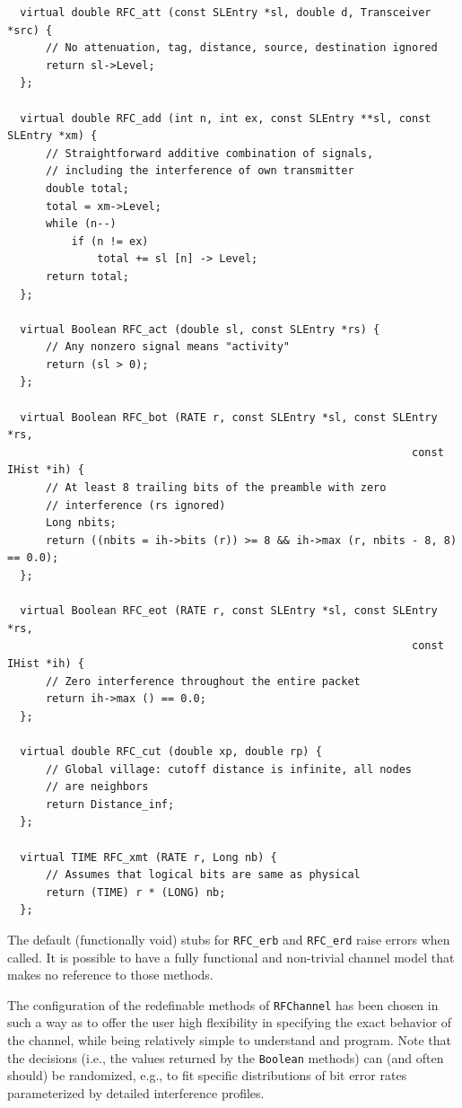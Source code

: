 {\small\begin{verbatim}
  virtual double RFC_att (const SLEntry *sl, double d, Transceiver *src) {
      // No attenuation, tag, distance, source, destination ignored
      return sl->Level;
  };

  virtual double RFC_add (int n, int ex, const SLEntry **sl, const SLEntry *xm) {
      // Straightforward additive combination of signals,
      // including the interference of own transmitter
      double total;
      total = xm->Level;
      while (n--)
          if (n != ex)
              total += sl [n] -> Level;
      return total;
  };

  virtual Boolean RFC_act (double sl, const SLEntry *rs) {
      // Any nonzero signal means "activity"
      return (sl > 0);
  };

  virtual Boolean RFC_bot (RATE r, const SLEntry *sl, const SLEntry *rs,
                                                               const IHist *ih) {
      // At least 8 trailing bits of the preamble with zero
      // interference (rs ignored)
      Long nbits;
      return ((nbits = ih->bits (r)) >= 8 && ih->max (r, nbits - 8, 8) == 0.0);
  };

  virtual Boolean RFC_eot (RATE r, const SLEntry *sl, const SLEntry *rs,
                                                               const IHist *ih) {
      // Zero interference throughout the entire packet
      return ih->max () == 0.0;
  };

  virtual double RFC_cut (double xp, double rp) {
      // Global village: cutoff distance is infinite, all nodes
      // are neighbors
      return Distance_inf;
  };

  virtual TIME RFC_xmt (RATE r, Long nb) {
      // Assumes that logical bits are same as physical
      return (TIME) r * (LONG) nb;
  };
\end{verbatim}}

The default (functionally void) stubs for {\tt RFC\_erb} and {\tt RFC\_erd}
raise errors when called.
It is possible to have a fully functional and non-trivial channel model that
makes no reference to those methods.

The configuration of the redefinable methods of {\tt RFChannel} has been
chosen in such a way as to offer the user high flexibility in specifying
the exact behavior of the channel, while being relatively simple to 
understand and program.
Note that the decisions (i.e., the values returned by the {\tt Boolean}
methods) can (and often should) be randomized,
e.g., to fit specific distributions of bit
error rates parameterized by detailed interference profiles.

